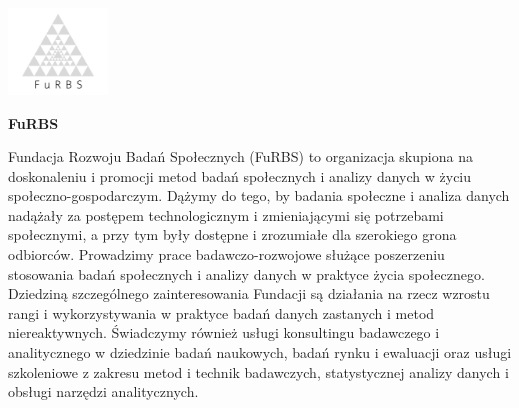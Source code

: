\documentclass[\main/boa.tex]{subfiles}
\begin{document}
	
	\begin{minipage}[t]{0.915\textwidth}
		\center     
		\includegraphics[width=100px]{img/logos.bw/furbs.png} 
	\end{minipage}
	
	\Large \textbf {FuRBS}
	
	
	\vskip 0.3cm
	\normalsize 
	Fundacja Rozwoju Badań Społecznych (FuRBS) to organizacja skupiona na doskonaleniu i promocji metod badań społecznych i analizy danych w życiu społeczno-gospodarczym. Dążymy do tego, by badania społeczne i analiza danych nadążały za postępem technologicznym i zmieniającymi się potrzebami społecznymi, a przy tym były dostępne i zrozumiałe dla szerokiego grona odbiorców. Prowadzimy prace badawczo-rozwojowe służące poszerzeniu stosowania badań społecznych i analizy danych w praktyce życia społecznego. Dziedziną szczególnego zainteresowania Fundacji są działania na rzecz wzrostu rangi i wykorzystywania w praktyce badań danych zastanych i metod niereaktywnych. Świadczymy również usługi konsultingu badawczego i analitycznego w dziedzinie badań naukowych, badań rynku i ewaluacji oraz usługi szkoleniowe z zakresu metod i technik badawczych, statystycznej analizy danych i obsługi narzędzi analitycznych.
	
\end{document}
